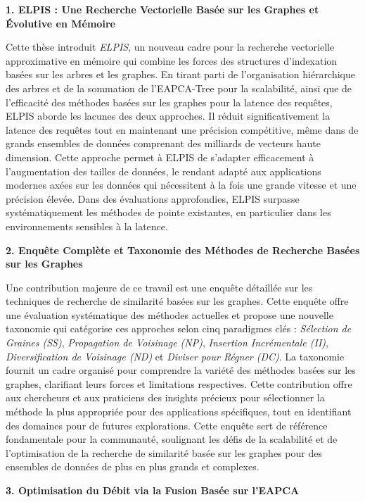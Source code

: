 \textbf{1. ELPIS : Une Recherche Vectorielle Basée sur les Graphes et Évolutive en Mémoire}

Cette thèse introduit \textit{ELPIS}, un nouveau cadre pour la recherche vectorielle approximative en mémoire qui combine les forces des structures d'indexation basées sur les arbres et les graphes. En tirant parti de l'organisation hiérarchique des arbres et de la sommation de l'EAPCA-Tree pour la scalabilité, ainsi que de l'efficacité des méthodes basées sur les graphes pour la latence des requêtes, ELPIS aborde les lacunes des deux approches. Il réduit significativement la latence des requêtes tout en maintenant une précision compétitive, même dans de grands ensembles de données comprenant des milliards de vecteurs haute dimension. Cette approche permet à ELPIS de s'adapter efficacement à l'augmentation des tailles de données, le rendant adapté aux applications modernes axées sur les données qui nécessitent à la fois une grande vitesse et une précision élevée. Dans des évaluations approfondies, ELPIS surpasse systématiquement les méthodes de pointe existantes, en particulier dans les environnements sensibles à la latence.

\textbf{2. Enquête Complète et Taxonomie des Méthodes de Recherche Basées sur les Graphes}

Une contribution majeure de ce travail est une enquête détaillée sur les techniques de recherche de similarité basées sur les graphes. Cette enquête offre une évaluation systématique des méthodes actuelles et propose une nouvelle taxonomie qui catégorise ces approches selon cinq paradigmes clés : \textit{Sélection de Graines (SS)}, \textit{Propagation de Voisinage (NP)}, \textit{Insertion Incrémentale (II)}, \textit{Diversification de Voisinage (ND)} et \textit{Diviser pour Régner (DC)}. La taxonomie fournit un cadre organisé pour comprendre la variété des méthodes basées sur les graphes, clarifiant leurs forces et limitations respectives. Cette contribution offre aux chercheurs et aux praticiens des insights précieux pour sélectionner la méthode la plus appropriée pour des applications spécifiques, tout en identifiant des domaines pour de futures explorations. Cette enquête sert de référence fondamentale pour la communauté, soulignant les défis de la scalabilité et de l'optimisation de la recherche de similarité basée sur les graphes pour des ensembles de données de plus en plus grands et complexes.

\textbf{3. Optimisation du Débit via la Fusion Basée sur l'EAPCA}

